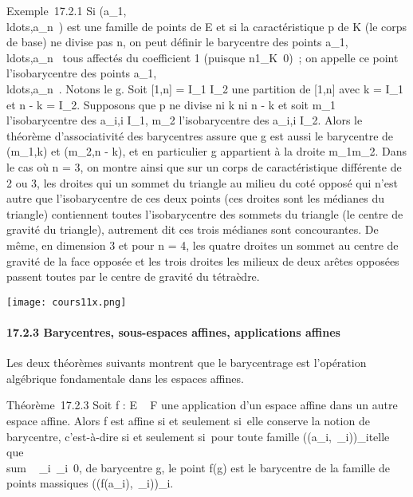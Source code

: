 \documentclass[]{article}
\begin{document}
Exemple~17.2.1 Si
(a\_1,\\ldots,a\_n~)
est une famille de points de E et si la caractéristique p de K (le corps
de base) ne divise pas n, on peut définir le barycentre des points
a\_1,\\ldots,a\_n~
tous affectés du coefficient 1 (puisque
n1\_K\neq~0)~; on appelle ce point
l'isobarycentre des points
a\_1,\\ldots,a\_n~.
Notons le g. Soit {[}1,n{]} = I\_1 \cup I\_2 une partition
de {[}1,n{]} avec k = \textbar{}I\_1\textbar{} et n - k =
\textbar{}I\_2\textbar{}. Supposons que p ne divise ni k ni n -
k et soit m\_1 l'isobarycentre des a\_i,i \in
I\_1, m\_2 l'isobarycentre des a\_i,i \in
I\_2. Alors le théorème d'associativité des barycentres assure
que g est aussi le barycentre de (m\_1,k) et (m\_2,n -
k), et en particulier g appartient à la droite m\_1m\_2.
Dans le cas où n = 3, on montre ainsi que sur un corps de
caractéristique différente de 2 ou 3, les droites qui \jmathoignent un sommet
du triangle au milieu du coté opposé qui n'est autre que l'isobarycentre
de ces deux points (ces droites sont les médianes du triangle)
contiennent toutes l'isobarycentre des sommets du triangle (le centre de
gravité du triangle), autrement dit ces trois médianes sont
concourantes. De même, en dimension 3 et pour n = 4, les quatre droites
\jmathoignant un sommet au centre de gravité de la face opposée et les trois
droites \jmathoignant les milieux de deux arêtes opposées passent toutes par
le centre de gravité du tétraèdre.

\texttt{[image: cours11x.png]}

\paragraph{17.2.3 Barycentres, sous-espaces affines, applications
affines}

Les deux théorèmes suivants montrent que le barycentrage est l'opération
algébrique fondamentale dans les espaces affines.

Théorème~17.2.3 Soit f : E \rightarrow~ F une application d'un espace affine dans
un autre espace affine. Alors f est affine si et seulement si~elle
conserve la notion de barycentre, c'est-à-dire si et seulement si~pour
toute famille \left
((a\_i,\lambda~\_i)\right )\_i\inI telle que
\\sum ~
\_i\inI\lambda~\_i\neq~0, de barycentre g,
le point f(g) est le barycentre de la famille de points massiques
\left
((f(a\_i),\lambda~\_i)\right )\_i\inI.
\end{document}

